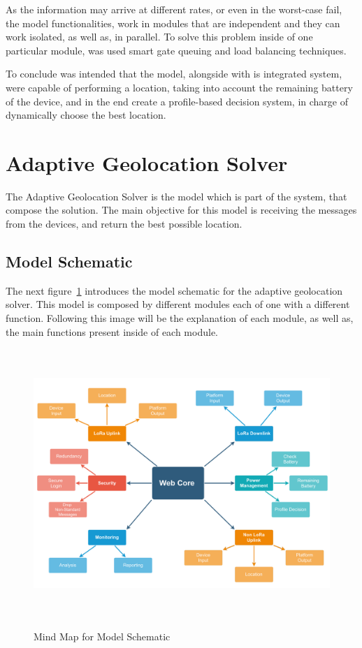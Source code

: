 As the information may arrive at different rates, or even in the worst-case fail, the model functionalities, work in modules that are independent and they can work isolated, as well as, in parallel. To solve this problem inside of one particular module, was used smart gate queuing and load balancing techniques.

To conclude was intended that the model, alongside with is integrated system, were capable of performing a location, taking into account the remaining battery of the device, and in the end create a profile-based decision system, in charge of dynamically choose the best location.





\newpage
\section{Adaptive Geolocation Solver}
The Adaptive Geolocation Solver is the model which is part of the system, that compose the solution. The main objective for this model is receiving the messages from the devices, and return the best possible location.


\label{sec:adaptive_geolocation_solver}
\subsection{Model Schematic}
The next figure~\ref{fig:Model_Schematic} introduces the model schematic for the adaptive geolocation solver.
This model is composed by different modules each of one with a different function. Following this image will be the explanation of each module, as well as, the main functions present inside of each module.

\begin{figure}[htbp]
  \centering
  
    {\includegraphics[height= 4in,width=0.92\linewidth]{Chapters/Figures/model_schematic3.pdf}}%
 
  \caption{Mind Map for Model Schematic}
  \label{fig:Model_Schematic}
\end{figure}



